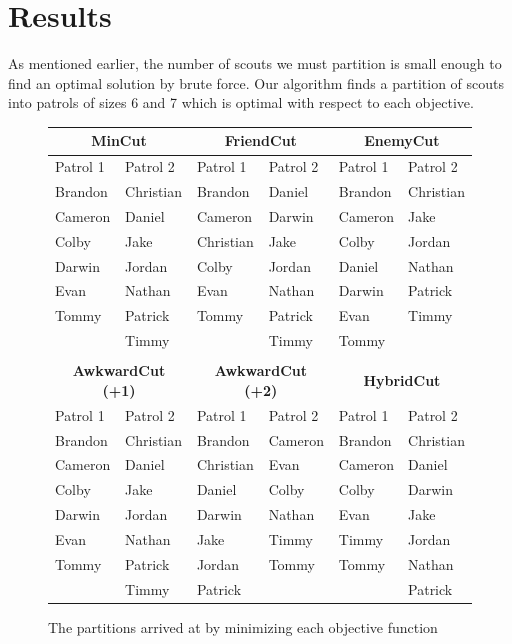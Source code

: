 \documentclass{amsart}
\theoremstyle{definition}
\theoremstyle{remark}
\numberwithin{equation}{section}
\begin{document}
\section*{Results}
As mentioned earlier, the number of scouts we must partition is small enough to find an optimal solution by brute force. Our algorithm finds a partition of scouts into patrols of sizes 6 and 7 which is optimal with respect to each objective.

\begin{figure}[h]
\centering
\begin{tabular}{ |l|l|l|l|l|l| }
\hline
\multicolumn{2}{|c|}{\textbf{MinCut}} & \multicolumn{2}{|c|}{\textbf{FriendCut}} & \multicolumn{2}{|c|}{\textbf{EnemyCut}}\\
\hline
Patrol 1 & Patrol 2 & Patrol 1 & Patrol 2 & Patrol 1 & Patrol 2\\
\hline
Brandon & Christian & Brandon & Daniel & Brandon & Christian\\
Cameron & Daniel & Cameron & Darwin & Cameron & Jake\\
Colby & Jake & Christian & Jake & Colby & Jordan\\
Darwin & Jordan & Colby & Jordan  & Daniel & Nathan\\
Evan & Nathan & Evan & Nathan & Darwin & Patrick\\
Tommy & Patrick & Tommy & Patrick & Evan & Timmy\\
& Timmy & & Timmy & Tommy & \\
\hline
\multicolumn{6}{|c|}{\hphantom{1}} \\
\hline
\multicolumn{2}{|c|}{\textbf{AwkwardCut (+1)}} & \multicolumn{2}{|c|}{\textbf{AwkwardCut (+2)}} & \multicolumn{2}{|c|}{\textbf{HybridCut}} \\
\hline
Patrol 1 & Patrol 2 & Patrol 1 & Patrol 2 & Patrol 1 & Patrol 2\\
\hline
Brandon & Christian & Brandon & Cameron & Brandon & Christian\\
Cameron & Daniel & Christian & Evan & Cameron & Daniel\\
Colby & Jake & Daniel & Colby & Colby & Darwin\\
Darwin & Jordan & Darwin & Nathan & Evan & Jake\\
Evan & Nathan & Jake & Timmy & Timmy & Jordan\\
Tommy & Patrick & Jordan & Tommy & Tommy & Nathan\\
\hphantom{1} & Timmy & Patrick & \hphantom{1} & \hphantom{1} & Patrick\\
\hline
\end{tabular}
\caption{The partitions arrived at by minimizing each objective function}
\end{figure}
\end{document}

